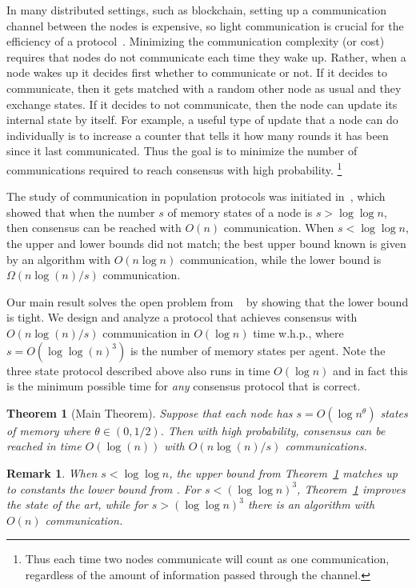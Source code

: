 \documentclass[a4paper,12pt]{article}
\newtheorem{theorem}{Theorem}
\newtheorem{remark}{Remark}
\begin{document}
In many distributed settings, such as blockchain, setting up a communication channel between the nodes is expensive, so light communication is crucial for the efficiency of a protocol~\cite{comm_init}. Minimizing the communication complexity (or cost) requires that nodes do not communicate each time they wake up. Rather, when a node wakes up it decides first whether to communicate or not. If it decides to communicate, then it gets matched with a random other node as usual and they exchange states. If it decides to not communicate, then the node can update its internal state by itself. For example, a useful type of update that a node can do individually is to increase a counter that tells it how many rounds it has been since it last communicated. Thus the goal is to minimize the number of communications required to reach consensus with high probability. \footnote{Thus each time two nodes communicate will count as one communication, regardless of the amount of information passed through the channel.}

The study of communication in population protocols was initiated in~\cite{comm_init}, which showed that when the number $s$ of memory states of a node is $s > \log \log{n}$, then consensus can be reached with $O(n)$ communication. When $s < \log \log{n}$, the upper and lower bounds did not match; the best upper bound known is given by an algorithm with $O(n \log{n})$ communication, while the lower bound is $\Omega(n \log(n)/s)$ communication. 

Our main result solves the open problem from ~\cite{comm_init} by showing that the lower bound is tight. We design and analyze a protocol that achieves consensus with $O(n\log(n)/s)$ communication in $O(\log{n})$ time w.h.p., where $s = O(\log \log(n)^3)$ is the number of memory states per agent. Note the three state protocol described above also runs in time $O(\log{n})$ and in fact this is the minimum possible time for \emph{any} consensus protocol that is correct.

\begin{theorem}[Main Theorem] \label{thm:main}
	Suppose that each node has $s=O(\log{n}^{\theta})$ states of memory where $\theta \in (0,1/2)$. Then with high probability, consensus can be reached in time $O(\log(n))$ with $O(n \log{(n)}/s)$ communications.
\end{theorem}

\begin{remark}
When $s < \log{\log{n}}$, the upper bound from Theorem~\ref{thm:main} matches up to constants the lower bound from \cite{comm_init}. For $s < \left( \log{\log{n}}\right)^3$, Theorem~\ref{thm:main} improves the state of the art, while for $s >  \left( \log{\log{n}}\right)^3$ there is an algorithm with $O(n)$ communication. 
\end{remark}
\end{document}
